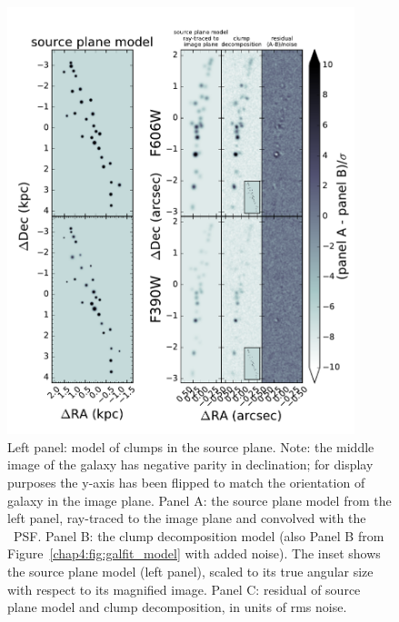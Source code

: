 \begin{figure}
\centering
\includegraphics[width=0.9\textwidth]{Chap4/c4f10.pdf}
\caption[Source plane model of SFR clumps in \giantarc]{Left panel: model of clumps in the source plane. Note: the middle image of the galaxy has negative parity in declination; for display purposes the y-axis has been flipped to match the orientation of galaxy in the image plane. Panel A: the source plane model from the left panel, ray-traced to the image plane and convolved with the \hst\ PSF. Panel B: the clump decomposition model (also Panel B from Figure~\ref{chap4:fig:galfit_model} with added noise). The inset shows the source plane model (left panel), scaled to its true angular size with respect to its magnified image. Panel C: residual of source plane model and clump decomposition, in units of rms noise.}
\label{chap4:fig:source_plane_model}
\end{figure}

